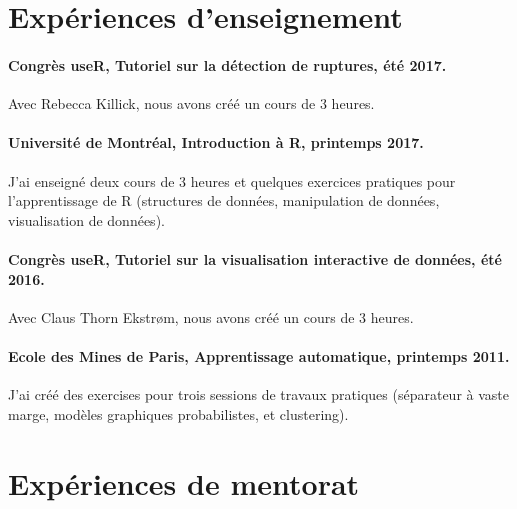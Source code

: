 \documentclass{article}
\begin{document}
\section{Expériences d'enseignement} 


\paragraph{Congrès useR, Tutoriel sur la détection de ruptures, été
  2017.} Avec Rebecca Killick, nous avons créé un cours de 3 heures.

\paragraph{Universit\'e de Montr\'eal, Introduction à R, printemps
  2017.} J'ai enseigné deux cours de 3 heures et quelques exercices
pratiques pour l'apprentissage de R (structures de données, manipulation de données, visualisation de données).

\paragraph{Congrès useR, Tutoriel sur la visualisation interactive de données, été 2016.} Avec Claus Thorn Ekstr\o m,
nous avons créé un cours de 3 heures.

\paragraph{Ecole des Mines de Paris, Apprentissage automatique,
  printemps 2011.} J'ai créé des exercises pour trois sessions de
travaux pratiques (séparateur à vaste marge, modèles graphiques
probabilistes, et clustering).

\newpage
\section{Expériences de mentorat}
\end{document}
